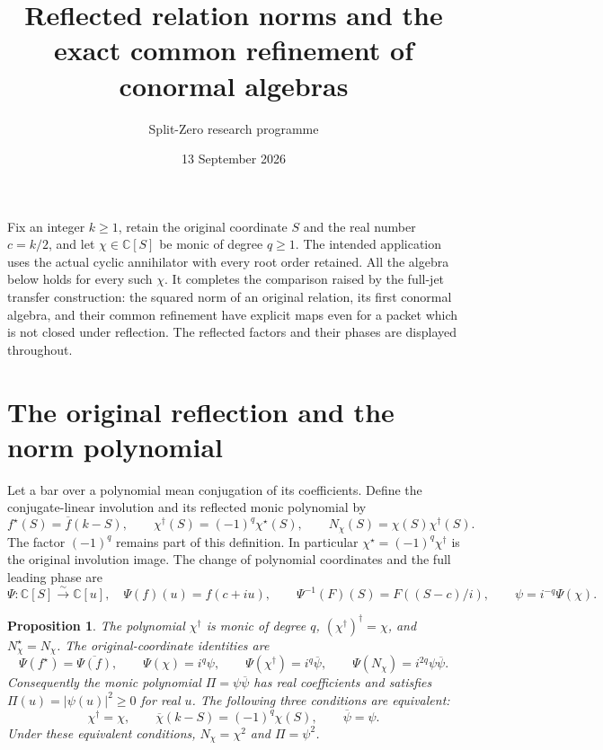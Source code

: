 \documentclass[11pt]{article}
\title{Reflected relation norms and the exact common refinement of conormal algebras}
\author{Split-Zero research programme}
\date{13 September 2026}
\newtheorem{proposition}[theorem]{Proposition}
\newcommand{\C}{\mathbb C}
\begin{document}
\maketitle

Fix an integer $k\ge1$, retain the original coordinate $S$ and the real
number $c=k/2$, and let $\chi\in\C[S]$ be monic of degree $q\ge1$.
The intended application uses the actual cyclic annihilator with every
root order retained. All the algebra below holds for every such $\chi$.
It completes the comparison raised by the full-jet transfer construction:
the squared norm of an original relation, its first conormal algebra,
and their common refinement have explicit maps even for a packet which
is not closed under reflection. The reflected factors and their phases
are displayed throughout.

\section{The original reflection and the norm polynomial}

Let a bar over a polynomial mean conjugation of its coefficients. Define
the conjugate-linear involution and its reflected monic polynomial by
\[
 f^\star(S)=\overline f(k-S),\qquad
 \chi^\dagger(S)=(-1)^q\chi^\star(S),\qquad
 N_\chi(S)=\chi(S)\chi^\dagger(S).
 \tag{RF.1}
\]
The factor $(-1)^q$ remains part of this definition. In particular
$\chi^\star=(-1)^q\chi^\dagger$ is the original involution image.
The change of polynomial coordinates and the full leading phase are
\[
 \Psi:\C[S]\xrightarrow{\sim}\C[u],\quad
 \Psi(f)(u)=f(c+iu),\qquad
 \Psi^{-1}(F)(S)=F((S-c)/i),\qquad
 \psi=i^{-q}\Psi(\chi).
 \tag{RF.2}
\]

\begin{proposition}
The polynomial $\chi^\dagger$ is monic of degree $q$,
$(\chi^\dagger)^\dagger=\chi$, and $N_\chi^\star=N_\chi$.
The original-coordinate identities are
\[
 \Psi(f^\star)=\overline{\Psi(f)},\qquad
 \Psi(\chi)=i^q\psi,\qquad
 \Psi(\chi^\dagger)=i^q\overline\psi,\qquad
 \Psi(N_\chi)=i^{2q}\psi\overline\psi.
 \tag{RF.3}
\]
Consequently the monic polynomial $\Pi=\psi\overline\psi$ has real
coefficients and satisfies $\Pi(u)=|\psi(u)|^2\ge0$ for real $u$.
The following three conditions are equivalent:
\[
 \chi^\dagger=\chi,\qquad
 \overline\chi(k-S)=(-1)^q\chi(S),\qquad
 \overline\psi=\psi.
 \tag{RF.4}
\]
Under these equivalent conditions, $N_\chi=\chi^2$ and $\Pi=\psi^2$.
\end{proposition}
\end{document}
